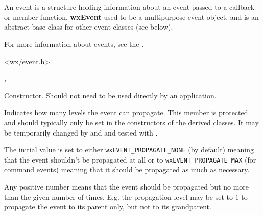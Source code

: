 \section{}\label{wxevent}

An event is a structure holding information about an event passed to a
callback or member function. {\bf wxEvent} used to be a multipurpose
event object, and is an abstract base class for other event classes (see below).

For more information about events, see the .





<wx/event.h>


,\rtfsp
{}



\label{wxeventctor}


Constructor. Should not need to be used directly by an application.


\label{wxeventmpropagationlevel}



Indicates how many levels the event can propagate. This member is protected and
should typically only be set in the constructors of the derived classes. It
may be temporarily changed by  
and  and tested with 
.

The initial value is set to either {\tt wxEVENT\_PROPAGATE\_NONE} (by
default) meaning that the event shouldn't be propagated at all or to 
{\tt wxEVENT\_PROPAGATE\_MAX} (for command events) meaning that it should be
propagated as much as necessary.

Any positive number means that the event should be propagated but no more than
the given number of times. E.g. the propagation level may be set to $1$ to
propagate the event to its parent only, but not to its grandparent.


